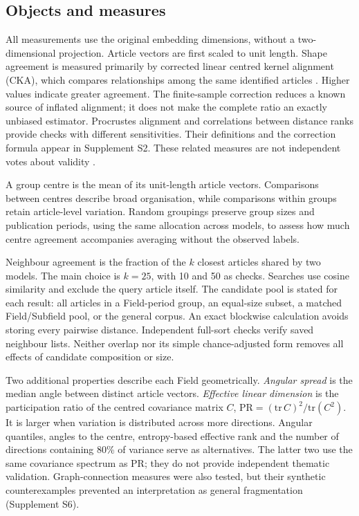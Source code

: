 \documentclass[12pt]{article}
\begin{document}
\subsection{Objects and measures}
All measurements use the original embedding dimensions, without a two-dimensional projection. Article vectors are first scaled to unit length. Shape agreement is measured primarily by corrected linear centred kernel alignment (CKA), which compares relationships among the same identified articles \citep{pmlr-v97-kornblith19a,refa961d84a4e}. Higher values indicate greater agreement. The finite-sample correction reduces a known source of inflated alignment; it does not make the complete ratio an exactly unbiased estimator. Procrustes alignment and correlations between distance ranks provide checks with different sensitivities. Their definitions and the correction formula appear in Supplement S2. These related measures are not independent votes about validity \citep{NEURIPS2021_252a3dba,pmlr-v285-williams24a}.

A group centre is the mean of its unit-length article vectors. Comparisons between centres describe broad organisation, while comparisons within groups retain article-level variation. Random groupings preserve group sizes and publication periods, using the same allocation across models, to assess how much centre agreement accompanies averaging without the observed labels.

Neighbour agreement is the fraction of the $k$ closest articles shared by two models. The main choice is $k=25$, with 10 and 50 as checks. Searches use cosine similarity and exclude the query article itself. The candidate pool is stated for each result: all articles in a Field-period group, an equal-size subset, a matched Field/Subfield pool, or the general corpus. An exact blockwise calculation avoids storing every pairwise distance. Independent full-sort checks verify saved neighbour lists. Neither overlap nor its simple chance-adjusted form removes all effects of candidate composition or size.

Two additional properties describe each Field geometrically. \emph{Angular spread} is the median angle between distinct article vectors. \emph{Effective linear dimension} is the participation ratio of the centred covariance matrix $C$, $\mathrm{PR}=(\mathrm{tr}\,C)^2/\mathrm{tr}(C^2)$. It is larger when variation is distributed across more directions. Angular quantiles, angles to the centre, entropy-based effective rank and the number of directions containing 80\% of variance serve as alternatives. The latter two use the same covariance spectrum as PR; they do not provide independent thematic validation. Graph-connection measures were also tested, but their synthetic counterexamples prevented an interpretation as general fragmentation (Supplement S6).
\end{document}

